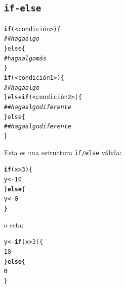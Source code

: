 \documentclass{article}\usepackage[]{graphicx}\usepackage[]{color}
\makeatletter
\newcommand{\hlnum}[1]{\textcolor[rgb]{0.686,0.059,0.569}{#1}}%
\newcommand{\hlcom}[1]{\textcolor[rgb]{0.678,0.584,0.686}{\textit{#1}}}%
\newcommand{\hlopt}[1]{\textcolor[rgb]{0,0,0}{#1}}%
\newcommand{\hlstd}[1]{\textcolor[rgb]{0.345,0.345,0.345}{#1}}%
\newcommand{\hlkwa}[1]{\textcolor[rgb]{0.161,0.373,0.58}{\textbf{#1}}}%
\newcommand{\hlkwb}[1]{\textcolor[rgb]{0.69,0.353,0.396}{#1}}%
\newcommand{\hlkwd}[1]{\textcolor[rgb]{0.737,0.353,0.396}{\textbf{#1}}}%
\newenvironment{kframe}{%
 \def\at@end@of@kframe{}%
 \ifinner\ifhmode%
  \def\at@end@of@kframe{\end{minipage}}%
  \begin{minipage}{\columnwidth}%
 \fi\fi%
 \def\FrameCommand##1{\hskip\@totalleftmargin \hskip-\fboxsep
 \colorbox{shadecolor}{##1}\hskip-\fboxsep
     \hskip-\linewidth \hskip-\@totalleftmargin \hskip\columnwidth}%
 \MakeFramed {\advance\hsize-\width
   \@totalleftmargin\z@ \linewidth\hsize
   \@setminipage}}%
 {\par\unskip\endMakeFramed%
 \at@end@of@kframe}
\newenvironment{knitrout}{}{} %
\makeatother
\begin{document}
  \subsection{\texttt{if-else}}
\begin{knitrout}
\color{fgcolor}\begin{kframe}
\begin{alltt}
  \hlkwd{if}(<condición>) \{
\hlcom{          ## haga algo}
  \} else \{
\hlcom{          # haga algo más}
  \}
  \hlkwd{if}(<condición1>) \{
\hlcom{          ## haga algo }
  \} else \hlkwd{if} (<condición2>) \{
\hlcom{          ## haga algo diferente}
  \} else \{
\hlcom{          ## haga algo diferente}
  \}
\end{alltt}
\end{kframe}
\end{knitrout}

  Esta es una estructura \texttt{if/else} válida:

\begin{knitrout}
\color{fgcolor}\begin{kframe}
\begin{alltt}
  \hlkwa{if}\hlstd{(x}  \hlopt{>} \hlnum{3}\hlstd{) \{}
          \hlstd{y} \hlkwb{<-} \hlnum{10}
  \hlstd{\}} \hlkwa{else} \hlstd{\{}
          \hlstd{y} \hlkwb{<-} \hlnum{0}
  \hlstd{\}}
\end{alltt}


{\ttfamily\noindent{}}\end{kframe}
\end{knitrout}

  o esta:  

\begin{knitrout}
\color{fgcolor}\begin{kframe}
\begin{alltt}
  \hlstd{y} \hlkwb{<-} \hlkwa{if}\hlstd{(x}  \hlopt{>} \hlnum{3}\hlstd{) \{}
          \hlnum{10}
  \hlstd{\}} \hlkwa{else} \hlstd{\{}
          \hlnum{0}
  \hlstd{\}}
\end{alltt}


{\ttfamily\noindent{}}\end{kframe}
\end{knitrout}
\end{document}
